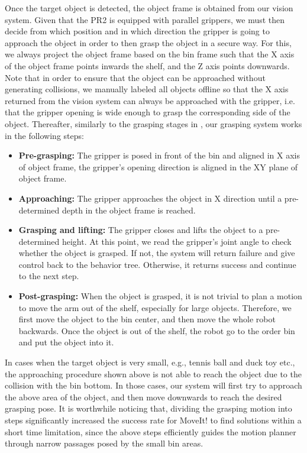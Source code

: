 Once the target object is detected, the object frame is obtained from our vision system. Given that the PR2 is equipped with parallel grippers, we must then decide from which position and in which direction the gripper is going to approach the object in order to then grasp the object
in a secure way. For this, we always project the object frame based on the bin frame such that the X axis of the object frame points inwards the shelf, and the Z axis points downwards. Note that in order to ensure that the object can be approached without generating collisions,
we manually labeled all objects offline so that the X axis returned from the vision system can always be approached with the gripper, i.e. that the gripper opening is wide enough to grasp the corresponding side of the object. Thereafter, similarly to the grasping stages in \cite{hang2016b}, our grasping system works in the following steps:
\begin{itemize}
 \item \textbf{Pre-grasping:} The gripper is posed in front of the bin and aligned in X axis of object frame, the gripper's opening direction is aligned in the XY plane of object frame.
 \item \textbf{Approaching:} The gripper approaches the object in X direction until a pre-determined depth in the object frame is reached.
 \item \textbf{Grasping and lifting:} The gripper closes and lifts the object to a pre-determined height. At this point, we read the gripper's joint angle to check whether the object is grasped. If not, the system will return failure and give control back to the behavior tree. Otherwise, it returns success and continue to the next step.
 \item \textbf{Post-grasping:} When the object is grasped, it is not trivial to plan a motion to move the arm out of the shelf, especially for large objects. Therefore, we first move the object to the bin center, and then move the whole robot backwards. Once the object is out of the shelf, the robot go to the order bin and put the object into it.
\end{itemize}
In cases when the target object is very small, e.g., tennis ball and duck toy etc., the approaching procedure shown above is not able to reach the object due to the collision with the bin bottom. In those cases, our system will first try to approach the above area of the object, and then move downwards to reach the desired grasping pose. It is worthwhile noticing that, dividing the grasping motion into steps significantly increased the success rate for MoveIt! to find solutions within a short time limitation, since the above steps efficiently guides the motion planner through narrow passages posed by the small bin areas. 
